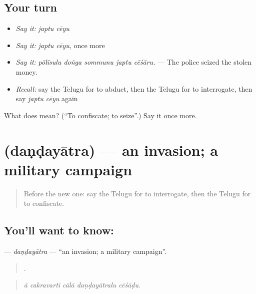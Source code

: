 \subsection*{Your turn}
\begin{itemize}
\raggedright
  \item \emph{Say it:} \emph{japtu cēyu}
  \item \emph{Say it:} \emph{japtu cēyu}, once more
  \item \emph{Say it:} \emph{pōlīsulu doṅga sommunu japtu cēśāru.} — The police seized the stolen money.
  \item \emph{Recall:} say the Telugu for to abduct, then the Telugu for to interrogate, then say \emph{japtu cēyu} again
\end{itemize}

\begin{tcolorbox}[breakable,colback=teal!4,colframe=teal!35!black,title={Before you move on}]
What does   mean? (\textquotedblleft{}To confiscate; to seize\textquotedblright{}.) Say it once more.
\end{tcolorbox}
\section[\texorpdfstring{\te{దండయాత్ర} (daṇḍayātra)}{దండయాత్ర (daṇḍayātra)}]{ (daṇḍayātra) — an invasion; a military campaign}

\label{lesson:TE-C381-dandayatra}



\begin{quote}
Before the new one: say the Telugu for to interrogate, then the Telugu for to confiscate.
\end{quote}

\subsection*{You'll want to know: }
\textbf{} — \emph{daṇḍayātra} — \textquotedblleft{}an invasion; a military campaign\textquotedblright{}.

\begin{quote}
    .
\end{quote}

\begin{quote}
\emph{ā cakravarti cālā daṇḍayātralu cēśāḍu.}
\end{quote}

